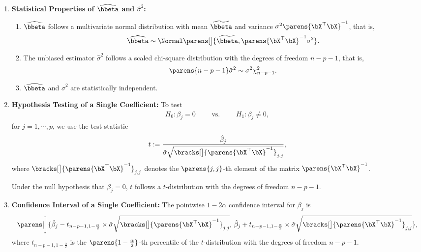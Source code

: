 \documentclass[12pt]{article}
\begin{document}
\begin{enumerate}[label=\textbf{\arabic*.}]
	\item \textbf{Statistical Properties of $\widehat{\bbeta}$ and $\hat{\sigma}^2$:} 
	\begin{enumerate}
		\item $\widehat{\bbeta}$ follows a multivariate normal distribution with mean $\widetilde{\bbeta}$ and variance $\sigma^2 \parens{\bX^\top \bX}^{-1} $, that is, 
		\begin{align*}
			\widehat{\bbeta} \sim \Normal \parens[\big]{\widetilde{\bbeta}, \parens{\bX^\top \bX}^{-1} \sigma^2}. 
		\end{align*}
		
		\item The unbiased estimator $\hat{\sigma}^2$ follows a scaled chi-square distribution with the degrees of freedom $n - p - 1$, that is, 
		\begin{align*}
			\parens{n - p - 1} \hat{\sigma}^2 \sim \sigma^2 \chi^2_{n-p-1}. 
		\end{align*}
		
		\item $\widehat{\bbeta}$ and $\hat{\sigma}^2$ are statistically independent. 
	\end{enumerate}
	
	\item \textbf{Hypothesis Testing of a Single Coefficient:} To test 
	\begin{align*}
		H_0: \beta_j = 0 \qquad \text{ vs. } \qquad H_1: \beta_j \neq 0, 
	\end{align*}
	for $j = 1, \cdots, p$, we use the test statistic
	\begin{align*}
		t := \frac{\hat{\beta}_j}{\hat{\sigma}\sqrt{\bracks[\big]{\parens{\bX^\top \bX}^{-1}}_{j,j}}}, 
	\end{align*}
	where $\bracks[\big]{\parens{\bX^\top \bX}^{-1}}_{j,j}$ denotes the $\parens{j,j}$-th element of the matrix $\parens{\bX^\top \bX}^{-1}$. 
	
	Under the null hypothesis that $\beta_j = 0$, $t$ follows a $t$-distribution with the degrees of freedom $n - p - 1$. 
	
	\item \textbf{Confidence Interval of a Single Coefficient:} The pointwise $1 - 2\alpha$ confidence interval for $\beta_j$ is 
	\begin{equation*}
		\parens[\bigg]{\hat{\beta}_j - t_{n-p-1, 1 - \frac{\alpha}{2}} \times \hat{\sigma}\sqrt{\bracks[\big]{\parens{\bX^\top \bX}^{-1}}_{j,j}}, \, \hat{\beta}_j + t_{n-p-1, 1-\frac{\alpha}{2}} \times \hat{\sigma} \sqrt{\bracks[\big]{\parens{\bX^\top \bX}^{-1}}_{j,j}}}, 
	\end{equation*}
	where $t_{n-p-1, 1 - \frac{\alpha}{2}}$ is the $\parens{1-\frac{\alpha}{2}}$-th percentile of the $t$-distribution with the degrees of freedom $n-p-1$. 
	

\end{enumerate}
\end{document}
